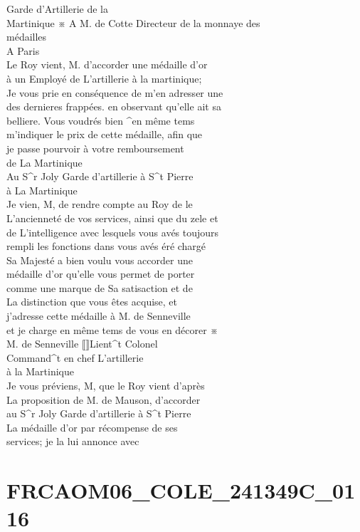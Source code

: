 \documentclass{article}
\begin{document}
\begin{pages}
Garde d'Artillerie de la\\
Martinique ※
\normalsize \pstart
A M. de Cotte Directeur de la monnaye des\\
médailles\\
A Paris\\
Le Roy vient, M. d'accorder une médaille d'or\\
à un Employé de L'artillerie à la martinique;\\
Je vous prie en conséquence de m'en adresser une\\
des dernieres frappées. en observant qu'elle ait sa\\
belliere. Vous voudrés bien \^{}en même tems\\
m'indiquer le prix de cette médaille, afin que\\
je passe pourvoir à votre remboursement\\
de La Martinique\\
Au S\^{}r Joly Garde d'artillerie à S\^{}t Pierre\\
à La Martinique\\
Je vien, M, de rendre compte au Roy de le\\
L'ancienneté de vos services, ainsi que du zele et\\
de L'intelligence avec lesquels vous avés toujours\\
rempli les fonctions dans vous avés éré chargé\\
Sa Majesté a bien voulu vous accorder une\\
médaille d'or qu'elle vous permet de porter\\
comme une marque de Sa satisaction et de\\
La distinction que vous êtes acquise, et\\
j'adresse cette médaille à M. de Senneville\\
et je charge en même tems de vous en décorer ※\\
M. de Senneville ⟦⟧Lient\^{}t Colonel\\
Command\^{}t en chef L'artillerie\\
à la Martinique\\
Je vous préviens, M, que le Roy vient d'après\\
La proposition de M. de Mauson, d'accorder\\
au S\^{}r Joly Garde d'artillerie à S\^{}t Pierre\\
La médaille d'or par récompense de ses\\
services; je la lui annonce avec
\pend
\endnumbering\beginnumbering\section{FRCAOM06\_COLE\_241349C\_0116}\pstart

\end{pages}
\end{document}
